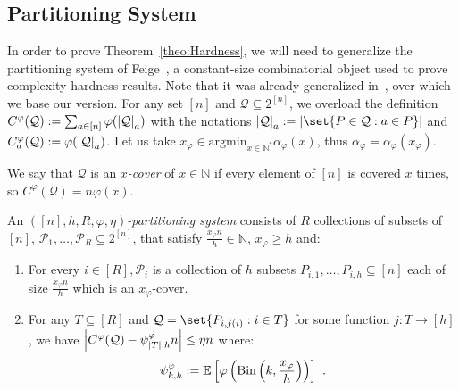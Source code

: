 \subsection{Partitioning System}
In order to prove Theorem~\ref{theo:Hardness}, we will need to generalize the partitioning system of Feige~\cite{Feige98}, a constant-size combinatorial object used to prove complexity hardness results. Note that it was already generalized in~\cite{BFGG20}, over which we base our version.
For any set $[n]$ and $\mathcal{Q} \subseteq 2^{[n]}$, we overload the definition $C^{\varphi}(\mathcal{Q}) := \sum_{a \in [n]} \varphi(\abs{\mathcal{Q}}_a)$ with the notations $\abs{\mathcal{Q}}_a:=\abs{\set{P \in \mathcal{Q} : a \in P}}$ and $C_a^{\varphi}(\mathcal{Q}) := \varphi(\abs{\mathcal{Q}}_a)$. Let us take $x_{\varphi} \in \text{argmin}_{x \in \mathbb{N}^*} \alpha_{\varphi}(x)$, thus $\alpha_{\varphi} = \alpha_{\varphi}(x_{\varphi})$.

We say that $\mathcal{Q}$ is an \emph{$x$-cover} of $x \in \mathbb{N}$ if every element of $[n]$ is covered $x$ times, so $C^{\varphi}(\mathcal{Q}) = n\varphi(x)$.

\begin{definition}
  An \emph{$([n],h,R,\varphi,\eta)$-partitioning system} consists of $R$ collections of subsets of $[n]$, $\mathcal{P}_1,\ldots,\mathcal{P}_R \subseteq 2^{[n]}$, that satisfy $\frac{x_{\varphi}n}{h} \in \mathbb{N}$, $x_{\varphi} \geq h$ and:
  \begin{enumerate}
  \item For every $i \in [R], \mathcal{P}_i$ is a collection of $h$ subsets $P_{i,1}, \ldots, P_{i,h} \subseteq [n]$ each of size $\frac{x_{\varphi}n}{h}$ which is an $x_{\varphi}$-cover.
  \item For any $T \subseteq [R]$ and $\mathcal{Q} = \set{P_{i,j(i)} : i \in T}$ for some function $j : T \rightarrow [h]$, we have $\abs{C^{\varphi}(\mathcal{Q}) -\psi^{\varphi}_{\abs{T},h} n} \leq \eta n$ where:
  \begin{align}
  \label{eq:def-phi}
   \psi^{\varphi}_{k,h} := \mathbb{E}\left[\varphi\left(\operatorname{\text{Bin}}\left(k,\frac{x_{\varphi}}{h}\right)\right)\right] \ .
   \end{align}
  \end{enumerate}
  \label{defi:PartSystem}
\end{definition}

